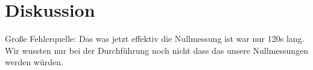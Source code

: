 \section{Diskussion}
\label{sec:Diskussion}


Große Fehlerquelle: Das was jetzt effektiv die Nullmessung ist war nur 120s lang.
Wir wussten nur bei der Durchführung noch nicht dass das unsere Nullmessungen werden würden. 
